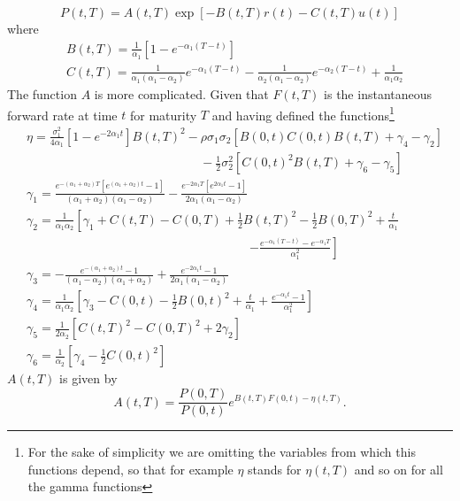 \begin{equation}
P(t,T) = A(t,T) \exp\left[ -B(t,T)r(t) - C(t,T)u(t) \right]
\end{equation}
where
\begin{align}
& B(t,T) = \frac{1}{\alpha_1}\left[ 1 - e^{-\alpha_1(T-t)} \right]\\
& C(t,T) = \frac{1}{\alpha_1(\alpha_1-\alpha_2)}e^{-\alpha_1(T-t)} - \frac{1}{\alpha_2(\alpha_1-\alpha_2)}e^{-\alpha_2(T-t)} + \frac{1}{\alpha_1\alpha_2}
\end{align}
The function $A$ is more complicated. Given that $F(t,T)$ is the instantaneous forward rate at time $t$ for maturity $T$ and having defined the functions\footnote{For the sake of simplicity we are omitting the variables from which this functions depend, so that for example $\eta$ stands for $\eta(t,T)$ and so on for all the gamma functions}
\begin{align}
 & \eta = \frac{\sigma_1^2}{4\alpha_1}\left[ 1-e^{-2\alpha_1 t} \right]B(t,T)^2 - \rho\sigma_1\sigma_2\left[ B(0,t)C(0,t)B(t,T) + \gamma_4 - \gamma_2 \right]\nonumber\\
 & \qquad\qquad\qquad\qquad\qquad\qquad\qquad -\frac{1}{2}\sigma_2^2 \left[ C(0,t)^2 B(t,T) + \gamma_6 - \gamma_5\right] \nonumber\\
 & \gamma_1 = \frac{e^{-(\alpha_1+\alpha_2)T}[e^{(\alpha_1+\alpha_2)t} - 1] }{(\alpha_1+\alpha_2)(\alpha_1-\alpha_2)} - \frac{e^{-2\alpha_1 T} [e^{2\alpha_1 t} -1 ]}{2\alpha_1(\alpha_1-\alpha_2)} \nonumber \\
 & \gamma_2 = \frac{1}{\alpha_1\alpha_2}\left[ \gamma_1 + C(t,T) - C(0,T) + \frac{1}{2} B(t,T)^2 - \frac{1}{2}B(0,T)^2 + \frac{t}{\alpha_1} \right.\nonumber\\
 & \qquad\qquad\qquad\qquad\qquad\qquad\qquad\qquad\qquad \left. - \frac{e^{-\alpha_1(T-t)} - e^{-\alpha_1T} }{\alpha_1^2} \right] \nonumber\\
 & \gamma_3 = -\frac{e^{-(\alpha_1+\alpha_2)t} -1}{(\alpha_1-\alpha_2)(\alpha_1+\alpha_2)} + \frac{e^{-2\alpha_1 t} - 1}{2\alpha_1 (\alpha_1-\alpha_2)} \nonumber\\
 & \gamma_4 = \frac{1}{\alpha_1\alpha_2} \left[ \gamma_3 - C(0,t) - \frac{1}{2}B(0,t)^2 + \frac{t}{\alpha_1} + \frac{e^{-\alpha_1 t} -1}{\alpha_1^2} \right] \nonumber\\
 & \gamma_5 = \frac{1}{2\alpha_2} \left[ C(t,T)^2 - C(0,T)^2 + 2\gamma_2 \right] \nonumber\\
 & \gamma_6 = \frac{1}{\alpha_2} \left[ \gamma_4 - \frac{1}{2}C(0,t)^2 \right] \nonumber
\end{align}
$A(t,T)$ is given by
\begin{equation}
A(t,T) = \frac{P(0,T)}{P(0,t)}e^{B(t,T)F(0,t) - \eta(t,T)}.
\end{equation}

